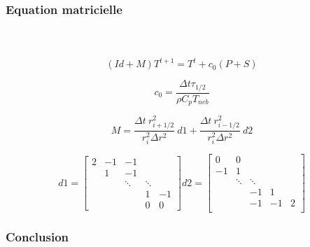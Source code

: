 \documentclass{beamer}
\begin{document}
\begin{frame}
	\frametitle{Equation matricielle}
	\framesubtitle{\ }
	
$$
(Id + M)T^{t+1} = T^t + c_0 ( P + S )
$$	
	
$$c_0 = \frac{\Delta t \tau_{1/2} }{\rho C_p T_{neb}}$$ 

$$
M = \frac{\Delta t ~ r^2_{i+1/2}}{r^2_i \Delta r^2} ~ d1 + \frac{\Delta t ~ r^2_{i-1/2}}{r^2_i \Delta r^2} ~ d2  
$$

$$
d1=
\begin{bmatrix}
    2      & -1     & -1       &   \\
           &  1     & -1              &             \\
     &        & \ddots    &\ddots       \\
     &        &            & 1 & -1         \\
         &   &      &   0         &  0
\end{bmatrix}
d2=
\begin{bmatrix}
     0     & 0      &   &     &        \\
    -1     & 1      &  &          &            \\
     & \ddots & \ddots &    &      \\
     &              &  -1      &  1         \\
         &      &  -1     & -1        & 2 \\
\end{bmatrix}
$$

\end{frame}


\begin{frame}
\frametitle{Conclusion}
\framesubtitle{\ }

\end{frame}

\end{document}
